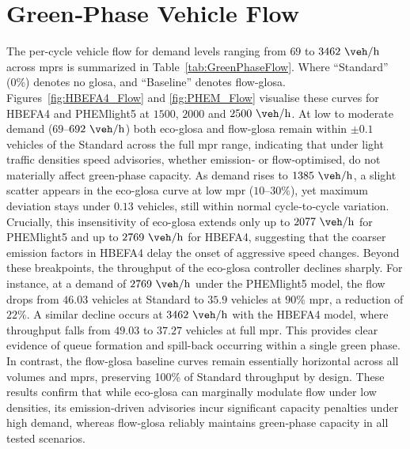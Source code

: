 \section{Green‐Phase Vehicle Flow}
\label{sec:Results_GreenPhaseFlow}

The per-cycle vehicle flow for demand levels ranging from $69$ to $3462~\unit{\veh\per\hour}$ across \acp{mpr} is summarized in Table~\vref{tab:GreenPhaseFlow}. Where \enquote{Standard} (0\%) denotes no \ac{glosa}, and \enquote{Baseline} denotes \ac{flow-glosa}. Figures~\vref{fig:HBEFA4_Flow} and \vref{fig:PHEM_Flow} visualise these curves for HBEFA4 and PHEMlight5 at $1500$, $2000$ and $2500~\unit{\veh\per\hour}$. 
At low to moderate demand ($69$--$692~\unit{\veh\per\hour}$) both \ac{eco-glosa} and \ac{flow-glosa} remain within $\pm 0.1$ vehicles of the Standard across the full \ac{mpr} range, indicating that under light traffic densities speed advisories, whether emission‐ or flow‐optimised, do not materially affect green‐phase capacity. As demand rises to $1385~\unit{\veh\per\hour}$, a slight scatter appears in the \ac{eco-glosa} curve at low \ac{mpr} ($10$--$30\%$), yet maximum deviation stays under $0.13$ vehicles, still within normal cycle‐to‐cycle variation. Crucially, this insensitivity of \ac{eco-glosa} extends only up to $2077~\unit{\veh\per\hour}$ for PHEMlight5 and up to $2769~\unit{\veh\per\hour}$ for HBEFA4, suggesting that the coarser emission factors in HBEFA4 delay the onset of aggressive speed changes. Beyond these breakpoints, the throughput of the \ac{eco-glosa} controller declines sharply. For instance, at a demand of $2769~\unit{\veh\per\hour}$ under the PHEMlight5 model, the flow drops from $46.03$ vehicles at Standard to $35.9$ vehicles at $90\%$ \ac{mpr}, a reduction of $22\%$. A similar decline occurs at $3462~\unit{\veh\per\hour}$ with the HBEFA4 model, where throughput falls from $49.03$ to $37.27$ vehicles at full \ac{mpr}. This provides clear evidence of queue formation and spill-back occurring within a single green phase. In contrast, the \ac{flow-glosa} baseline curves remain essentially horizontal across all volumes and \ac{mpr}s, preserving 100\% of Standard throughput by design. These results confirm that while \ac{eco-glosa} can marginally modulate flow under low densities, its emission‐driven advisories incur significant capacity penalties under high demand, whereas \ac{flow-glosa} reliably maintains green‐phase capacity in all tested scenarios.
